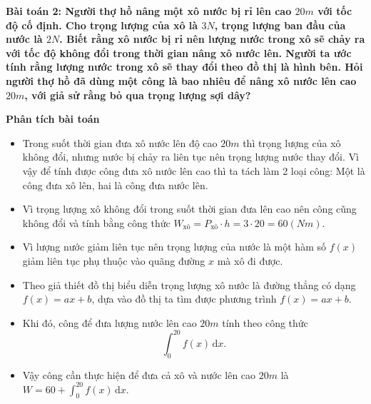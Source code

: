 \documentclass[12pt,a4paper]{article}
\newcommand{\dd}{\,\mathrm{d}}
\newcommand{\analysis}{\noindent\raisebox{0.15ex}{\rule{1.6ex}{1.6ex}}\hspace{4pt}\textbf{Phân tích bài toán}\par}
\begin{document}
\textbf{Bài toán 2: Người thợ hồ nâng một xô nước bị rỉ lên cao $20m$ với tốc độ cố định. Cho trọng lượng của xô là $3N$, trọng lượng ban đầu của nước là $2N$. Biết rằng xô nước bị rỉ nên lượng nước trong xô sẽ chảy ra với tốc độ không đổi trong thời gian nâng xô nước lên. Người ta ước tính rằng lượng nước trong xô sẽ thay đổi theo đồ thị là hình bên. Hỏi người thợ hồ đã dùng một công là bao nhiêu để nâng xô nước lên cao $20m$, với giả sử rằng bỏ qua trọng lượng sợi dây?}\par\medskip

\begin{analysisbox}
\analysis
\begin{itemize}
\item Trong suốt thời gian đưa xô nước lên độ cao $20m$ thì trọng lượng của xô không đổi, nhưng nước bị chảy ra liên tục nên trọng lượng nước thay đổi. Vì vậy để tính được công đưa xô nước lên cao thì ta tách làm 2 loại công: Một là công đưa xô lên, hai là công đưa nước lên.
\item Vì trọng lượng xô không đổi trong suốt thời gian đưa lên cao nên công cũng không đổi và tính bằng công thức $W_{\text{xô}}=P_{\text{xô}}\cdot h=3\cdot20=60(Nm)$.
\item Vì lượng nước giảm liên tục nên trọng lượng của nước là một hàm số $f(x)$ giảm liên tục phụ thuộc vào quãng đường $x$ mà xô đi được.
\item Theo giả thiết đồ thị biểu diễn trọng lượng xô nước là đường thẳng có dạng $f(x)=ax+b$, dựa vào đồ thị ta tìm được phương trình $f(x)=ax+b$.
\item Khi đó, công để đưa lượng nước lên cao $20m$ tính theo công thức
\[
\int_0^{20}f(x)\dd x.
\]
\item Vậy công cần thực hiện để đưa cả xô và nước lên cao $20m$ là $W=60+\int_0^{20}f(x)\dd x$.
\end{itemize}
\end{analysisbox}
\end{document}
